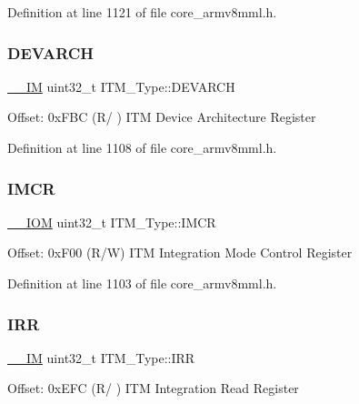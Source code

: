 Definition at line 1121 of file core\+\_\+armv8mml.\+h.

\mbox{\label{struct_i_t_m___type_a2372a4ebb63e36d1eb3fcf83a74fd537}} 
\subsubsection{\texorpdfstring{D\+E\+V\+A\+R\+CH}{DEVARCH}}
{\footnotesize\ttfamily \hyperlink{core__sc300_8h_a4cc1649793116d7c2d8afce7a4ffce43}{\+\_\+\+\_\+\+IM} uint32\+\_\+t I\+T\+M\+\_\+\+Type\+::\+D\+E\+V\+A\+R\+CH}

Offset\+: 0x\+F\+BC (R/ ) I\+TM Device Architecture Register 

Definition at line 1108 of file core\+\_\+armv8mml.\+h.

\mbox{\label{struct_i_t_m___type_ae2ce4d3a54df2fd11a197ccac4406cd0}} 
\subsubsection{\texorpdfstring{I\+M\+CR}{IMCR}}
{\footnotesize\ttfamily \hyperlink{core__sc300_8h_ab6caba5853a60a17e8e04499b52bf691}{\+\_\+\+\_\+\+I\+OM} uint32\+\_\+t I\+T\+M\+\_\+\+Type\+::\+I\+M\+CR}

Offset\+: 0x\+F00 (R/W) I\+TM Integration Mode Control Register 

Definition at line 1103 of file core\+\_\+armv8mml.\+h.

\mbox{\label{struct_i_t_m___type_a66eb82a070953f09909f39b8e516fb91}} 
\subsubsection{\texorpdfstring{I\+RR}{IRR}}
{\footnotesize\ttfamily \hyperlink{core__sc300_8h_a4cc1649793116d7c2d8afce7a4ffce43}{\+\_\+\+\_\+\+IM} uint32\+\_\+t I\+T\+M\+\_\+\+Type\+::\+I\+RR}

Offset\+: 0x\+E\+FC (R/ ) I\+TM Integration Read Register 

